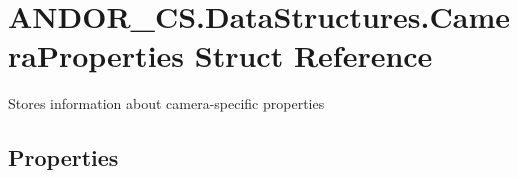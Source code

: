 \hypertarget{struct_a_n_d_o_r___c_s_1_1_data_structures_1_1_camera_properties}{}\section{A\+N\+D\+O\+R\+\_\+\+C\+S.\+Data\+Structures.\+Camera\+Properties Struct Reference}
\label{struct_a_n_d_o_r___c_s_1_1_data_structures_1_1_camera_properties}


Stores information about camera-\/specific properties  


\subsection*{Properties}
